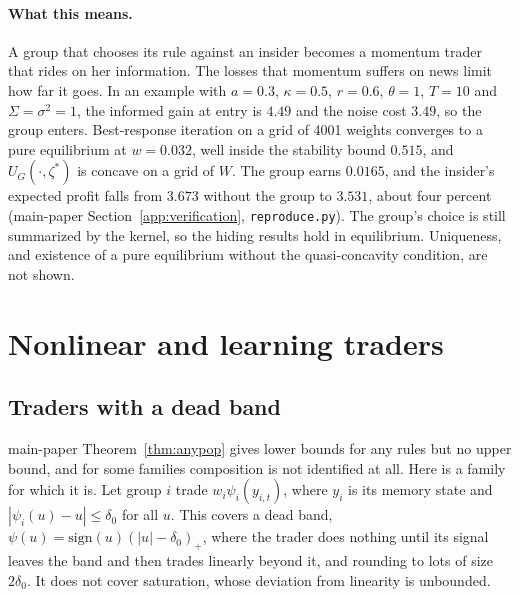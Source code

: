 \documentclass[12pt]{article}
\theoremstyle{definition}
\theoremstyle{remark}
\begin{document}
\paragraph{What this means.} A group that chooses its rule against an insider becomes a momentum trader that rides on her information. The losses that momentum suffers on news limit how far it goes. In an example with $a=0.3$, $\kappa=0.5$, $r=0.6$, $\theta=1$, $T=10$ and $\Sigma=\sigma^2=1$, the informed gain at entry is $4.49$ and the noise cost $3.49$, so the group enters. Best-response iteration on a grid of 4001 weights converges to a pure equilibrium at $w=0.032$, well inside the stability bound $0.515$, and $U_G(\cdot,\zeta^*)$ is concave on a grid of $W$. The group earns $0.0165$, and the insider's expected profit falls from $3.673$ without the group to $3.531$, about four percent (main-paper Section~\ref{app:verification}, \nolinkurl{reproduce.py}). The group's choice is still summarized by the kernel, so the hiding results hold in equilibrium. Uniqueness, and existence of a pure equilibrium without the quasi-concavity condition, are not shown.

\section{Nonlinear and learning traders}

\subsection{Traders with a dead band}

main-paper Theorem~\ref{thm:anypop} gives lower bounds for any rules but no upper bound, and for some families composition is not identified at all. Here is a family for which it is. Let group $i$ trade $w_i\psi_i(y_{i,t})$, where $y_i$ is its memory state and $|\psi_i(u)-u|\le\delta_0$ for all $u$. This covers a dead band, $\psi(u)=\mathrm{sign}(u)(|u|-\delta_0)_+$, where the trader does nothing until its signal leaves the band and then trades linearly beyond it, and rounding to lots of size $2\delta_0$. It does not cover saturation, whose deviation from linearity is unbounded.
\end{document}
